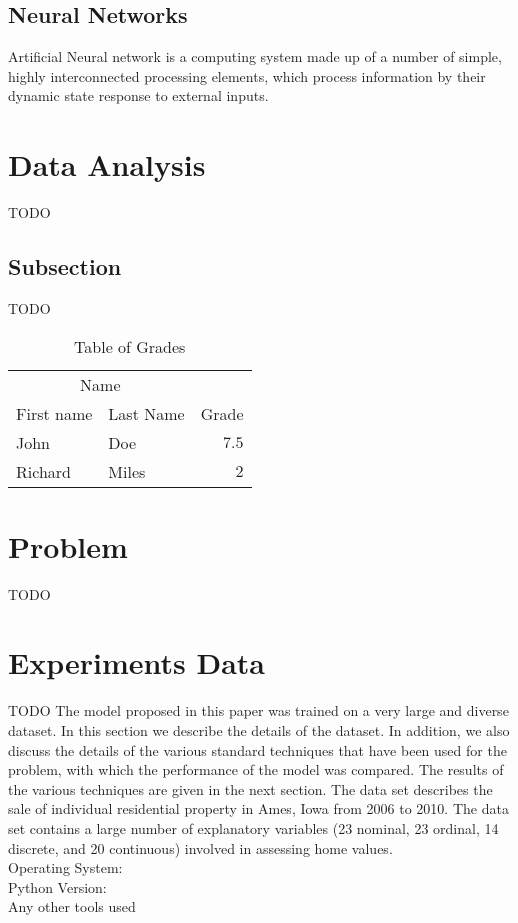\documentclass[fleqn,10pt]{SelfArx} %
\begin{document}
\subsection{Neural Networks}
Artificial Neural network is a computing system made up of a number of simple, highly interconnected processing elements, which process information by their dynamic state response to external inputs.

\section{Data Analysis}

TODO

\subsection{Subsection}

TODO 

\begin{table}[hbt]
\caption{Table of Grades}
\centering
\begin{tabular}{llr}
\toprule
\multicolumn{2}{c}{Name} \\
\cmidrule(r){1-2}
First name & Last Name & Grade \\
\midrule
John & Doe & $7.5$ \\
Richard & Miles & $2$ \\
\bottomrule
\end{tabular}
\label{tab:label}
\end{table}

\section{Problem}
TODO


\section{Experiments Data}
TODO
The model proposed in this paper was trained on a very
large and diverse dataset. In this section we describe the
details of the dataset. In addition, we also discuss the details
of the various standard techniques that have been used for
the problem, with which the performance of the model was
compared. The results of the various techniques are given
in the next section. The data set describes the sale of individual residential property in Ames, Iowa from 2006 to 2010. The data set contains a large number of explanatory variables (23 nominal, 23 ordinal, 14 discrete, and 20 continuous) involved in assessing home
values.\\
Operating System: \\
Python Version: \\
Any other tools used \\
\end{document}
